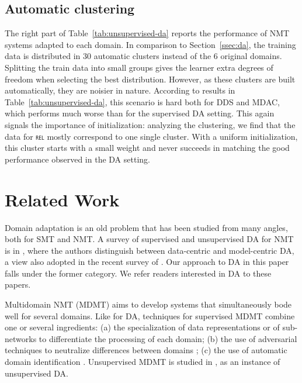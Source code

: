\documentclass[11pt]{article}
\newcommand{\domain}[1]{\texttt{\textsc{#1}}}
\begin{document}
\subsection{Automatic clustering}\label{ssec:clda}
The right part of Table~\ref{tab:unsupervised-da} reports the performance of NMT systems adapted to each domain.
In comparison to Section~\ref{ssec:da}, the training data is distributed in 30 automatic clusters instead of the 6 original domains. Splitting the train data into small groups gives the learner extra degrees of freedom when selecting the best distribution. However, as these clusters are built automatically, they are noisier in nature. According to results in Table~\ref{tab:unsupervised-da}, this scenario is hard both for DDS and MDAC, which performs much worse than for the supervised DA setting. This again signals the importance of initialization: analyzing the clustering, we find that the data for \domain{rel} mostly correspond to one single cluster. With a uniform initialization, this cluster starts with a small weight and never succeeds in matching the good performance observed in the DA setting.

\section{Related Work \label{sec:related}}

Domain adaptation is an old problem that has been studied from many angles, both for SMT and NMT. A survey of supervised and unsupervised DA for NMT is in , where the authors distinguish between data-centric and model-centric DA, a view also adopted in the recent survey of . Our approach to DA in this paper falls under the former category. We refer readers interested in DA to these papers.

Multidomain NMT (MDMT) aims to develop systems that simultaneously bode well for several domains. Like for DA, techniques for supervised MDMT combine one or several ingredients: (a) the specialization of data representations \cite{Kobus17domaincontrol} or of sub-networks \cite{Pham19generic} to differentiate the processing of each domain; (b) the use of adversarial techniques to neutralize differences between domains \cite{Britz17mixing}; (c) the use of automatic domain identification \cite{Jiang19multidomain}. Unsupervised MDMT is studied in , as an instance of unsupervised DA.
\end{document}
